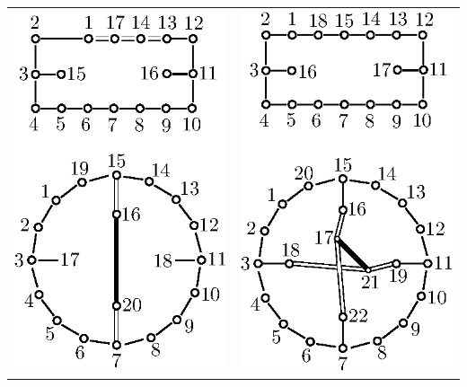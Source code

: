 \begin{enumerate}
\begin{landscape}
{\begin{longtable}{@{}ll@{}}
{\includegraphics{346.eps}} & {\includegraphics{347a.eps}}\\

\end{longtable}}
\end{landscape}
\end{enumerate}
